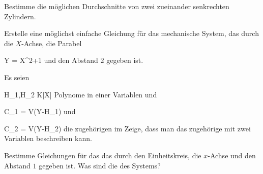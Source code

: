 \setcounter{section}{8}







{}
{





Bestimme die möglichen Durchschnitte von zwei zueinander senkrechten Zylindern.





}
{} {}

{}
{





Erstelle eine möglichst einfache Gleichung für das mechanische System, das durch die $X$-Achse, die
 {} {}
Parabel

\mavergleichskette
{\vergleichskette
{Y
}
{ = }{ X^2+1
}
{  }{
}
{    }{
}
{   }{
}
}
{}{}{}
und den Abstand $2$ gegeben ist.





}
{} {}

{}
{





Es seien

\mavergleichskette
{\vergleichskette
{ H_1,H_2
}
{ \in }{ K[X]
}
{  }{
}
{    }{
}
{   }{
}
}
{}{}{}
Polynome in einer Variablen und

\mavergleichskette
{\vergleichskette
{ C_1
}
{ = }{ V(Y-H_1)
}
{  }{
}
{    }{
}
{   }{
}
}
{}{}{}
und

\mavergleichskette
{\vergleichskette
{ C_2
}
{ = }{ V(Y-H_2)
}
{  }{
}
{    }{
}
{   }{
}
}
{}{}{}
die zugehörigen
im
 Zeige, dass man das zugehörige
 {} {}
mit zwei Variablen beschreiben kann.





}
{} {}

{}
{





Bestimme Gleichungen für das
das durch den Einheitskreis, die $x$-Achse und den Abstand $1$ gegeben ist. Was sind die
des Systems?





}
{} {}

